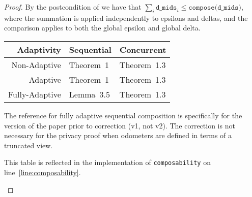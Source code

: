 \documentclass{article}
\begin{document}
\begin{proof}
  By the postcondition of  we have that $\sum_i \texttt{d\_mids}_i \le \texttt{compose(d\_mids)}$,
  where the summation is applied independently to epsilons and deltas, and the comparison applies to both the global epsilon and global delta.

  \begin{center}
    \begin{tabular}{ r | l l }
      Adaptivity & Sequential & Concurrent \\ 
      \hline
      Non-Adaptive & Theorem~1\cite{dwork2006gaussian} & Theorem~1.3\cite{vadhan2023concurrent} \\  
      Adaptive & Theorem~1\cite{dwork2006gaussian} & Theorem~1.3\cite{vadhan2023concurrent} \\
      Fully-Adaptive & Lemma~3.5\cite{rogers2021payasyougo} & Theorem~1.3\cite{vadhan2023concurrent}
    \end{tabular}

    The reference for fully adaptive sequential composition is specifically for the version of the paper prior to correction (v1, not v2).
    The correction is not necessary for the privacy proof when odometers are defined in terms of a truncated view.

    This table is reflected in the implementation of \texttt{composability} on line~\ref{line:composability}.
  \end{center}
  
\end{proof}



\end{document}
